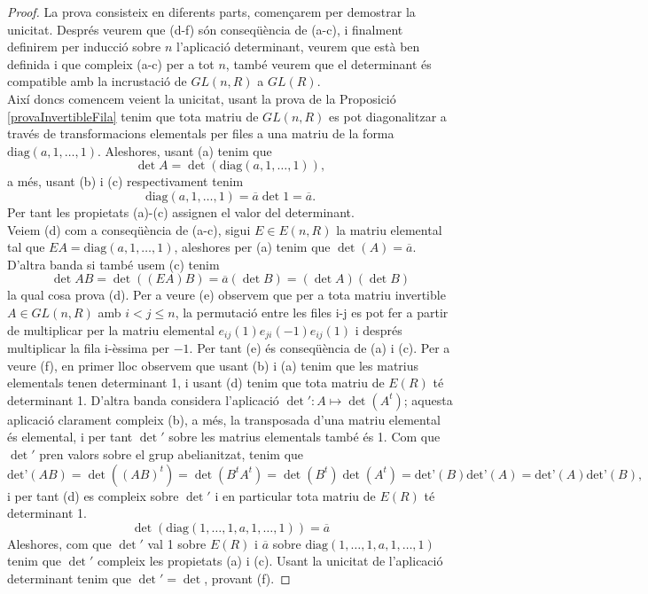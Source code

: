 \begin{proof}
\indent La prova consisteix en diferents parts, començarem per demostrar la unicitat. 
Després veurem que (d-f) són conseqüència de (a-c), i finalment definirem per inducció sobre $n$ l'aplicació determinant, veurem que està ben definida i que compleix (a-c) per a tot $n$, també veurem que el determinant és compatible amb la incrustació de $GL(n,R)$ a $GL(R)$. \\
\indent Així doncs comencem veient la unicitat, usant la prova de la Proposició  \ref{provaInvertibleFila} tenim que tota matriu de $GL(n,R)$ es pot diagonalitzar a través de transformacions elementals per files a una matriu de la forma $\text{diag}(a,1,\dots,1)$. Aleshores, usant (a) tenim que $$\det{A} = \det{ \left(\text{diag}(a,1,\dots,1)\right)},$$
a més, usant (b) i (c) respectivament tenim 
$$\text{diag}(a,1,\dots,1) = \overline{a}\det{1} = \overline{a}.
$$ Per tant les propietats (a)-(c) assignen el valor del determinant. \\
\indent Veiem (d) com a conseqüència de (a-c), sigui $E\in E(n,R)$ la matriu elemental tal que $EA=\text{diag}(a,1,\dots ,1)$, aleshores per (a) tenim que $\det(A)=\overline{a}$. D'altra banda si també usem (c) tenim
$$
\det{AB}=\det{((EA)B)} = \overline{a}(\det{B})=(\det{A})(\det{B})
$$
la qual cosa prova (d). Per a veure (e) observem que per a tota matriu invertible $A\in GL(n,R)$ amb $i<j\leq n$, la permutació entre les files i-j es pot fer a partir de multiplicar per la matriu elemental $e_{ij}(1)e_{ji}(-1)e_{ij}(1)$ i després multiplicar la fila i-èssima per $-1$. Per tant (e) és conseqüència de (a) i (c). Per a veure (f), en primer lloc observem que usant (b) i (a) tenim que les matrius elementals tenen determinant 1, i usant (d) tenim que tota matriu de $E(R)$ té determinant 1. D'altra banda considera l'aplicació $\det':A\mapsto \det{(A^t)}$; aquesta aplicació clarament compleix (b), a més, la transposada d'una matriu elemental és elemental, i per tant $\det'$ sobre les matrius elementals també és 1. Com que $\det ' $ pren valors sobre el grup abelianitzat, tenim que 
$$
\text{det'}(AB)=\det((AB)^t)=\det(B^tA^t) = \det(B^t)\det(A^t)= \text{det'}(B)\text{det'}(A) = \text{det'}(A)\text{det'}(B),
$$
i per tant (d) es compleix sobre $\det '$ i en particular tota matriu de $E(R)$ té determinant 1.
$$
\det (\text{diag}(1,\dots , 1 , a,1,\dots , 1))= \overline{a}
$$
Aleshores, com que $\det '$ val 1 sobre $E(R)$ i $\overline{a}$ sobre $\text{diag}(1,\dots , 1 , a,1,\dots , 1)$ tenim que $\det '$ compleix les propietats (a) i (c). Usant la unicitat de l'aplicació determinant tenim que $\det'=\det$, provant (f).


\end{proof}
